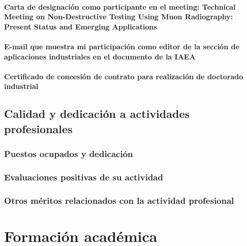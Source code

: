 \documentclass[a4paper, 11pt, twoside, openright]{report}
\begin{document}
\subsubsection{Carta de designación como participante en el meeting: Technical Meeting on Non-Destructive Testing Using Muon Radiography: Present Status and Emerging Applications}


\subsubsection{E-mail que muestra mi participación como editor de la sección de aplicaciones industriales en el documento de la IAEA}


\subsubsection{Certificado de concesión de contrato para realización de doctorado industrial}



\section{Calidad y dedicación a actividades profesionales}

\subsection{Puestos ocupados y dedicación}

\subsection{Evaluaciones positivas de su actividad}

\subsection{Otros méritos relacionados con la actividad profesional}

\chapter{Formación académica}
\end{document}
